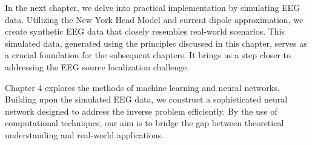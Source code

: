 \documentclass[a4paper, UKenglish, 11pt]{uiomaster}
\begin{document}
In the next chapter, we delve into practical implementation by simulating EEG data. Utilizing the New York Head Model and current dipole approximation, we create synthetic EEG data that closely resembles real-world scenarios. This simulated data, generated using the principles discussed in this chapter, serves as a crucial foundation for the subsequent chapters. It brings us a step closer to addressing the EEG source localization challenge.

Chapter 4 explores the methods of machine learning and neural networks. Building upon the simulated EEG data, we construct a sophisticated neural network designed to address the inverse problem efficiently. By the use of computational techniques, our aim is to bridge the gap between theoretical understanding and real-world applications.
\end{document}
